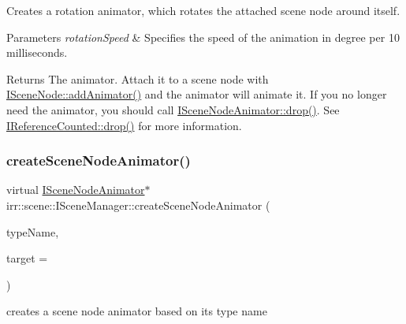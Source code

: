 Creates a rotation animator, which rotates the attached scene node around itself. 


\begin{DoxyParams}{Parameters}
{\em rotation\+Speed} & Specifies the speed of the animation in degree per 10 milliseconds. \\
\hline
\end{DoxyParams}
\begin{DoxyReturn}{Returns}
The animator. Attach it to a scene node with \hyperlink{classirr_1_1scene_1_1ISceneNode_a0e5cd342cd7293c136e53e2c2c5e0f3a}{I\+Scene\+Node\+::add\+Animator()} and the animator will animate it. If you no longer need the animator, you should call \hyperlink{classirr_1_1IReferenceCounted_a03856a09355b89d178090c4a5f738543}{I\+Scene\+Node\+Animator\+::drop()}. See \hyperlink{classirr_1_1IReferenceCounted_a03856a09355b89d178090c4a5f738543}{I\+Reference\+Counted\+::drop()} for more information. 
\end{DoxyReturn}
\mbox{\label{classirr_1_1scene_1_1ISceneManager_ac63c38a05b8e7d0a11ddb1752da36835}} 
\subsubsection{\texorpdfstring{create\+Scene\+Node\+Animator()}{createSceneNodeAnimator()}}
{\footnotesize\ttfamily virtual \hyperlink{classirr_1_1scene_1_1ISceneNodeAnimator}{I\+Scene\+Node\+Animator}$\ast$ irr\+::scene\+::\+I\+Scene\+Manager\+::create\+Scene\+Node\+Animator (\begin{DoxyParamCaption}\item[{const char $\ast$}]{type\+Name,  }\item[{\hyperlink{classirr_1_1scene_1_1ISceneNode}{I\+Scene\+Node} $\ast$}]{target = {} }\end{DoxyParamCaption})\hspace{0.3cm}{\ttfamily [pure virtual]}}



creates a scene node animator based on its type name 


